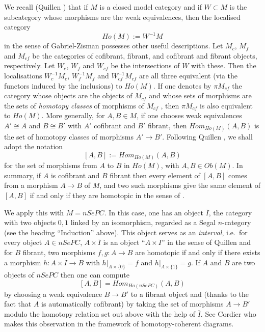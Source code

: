 
We recall (Quillen \cite{Quillen}) that if $M$ is a closed model
category and if $W\subset M$ is the subcategory whose morphisms are
the weak equivalences, then the localised category
$$
Ho(M):= W^{-1}M
$$
in the sense of Gabriel-Zisman \cite{GabrielZisman} possesses other useful
descriptions. Let $M_c$, $M_f$ and $M_{cf}$ be the categories of cofibrant,
fibrant, and cofibrant and fibrant objects, respectively. Let $W_c$, $W_f$ and
$W_{cf}$ be the intersections of $W$ with these. Then the localisations
$W_c^{-1} M_c$, $W_f^{-1}M_f$ and $W_{cf}^{-1}M_{cf}$ are all three
equivalent (via
the functors induced by the inclusions) to $Ho(M)$.
If one denotes by $\pi M_{cf}$ the category whose objects are the objects of
$M_{cf}$ and whose sets of morphisms are the sets of {\em homotopy
classes} of morphisms of $M_{cf}$ \cite{Quillen}, then $\pi M_{cf}$
is also
equivalent to $Ho(M)$. More generally, for $A,B\in M$, if one chooses
weak equivalences $A'\cong A$ and $B\cong B'$ with $A'$ cofibrant and
$B'$ fibrant, then $Hom _{Ho(M)}(A,B)$ is the set of homotopy classes
of morphisms $A'\rightarrow B'$. Following Quillen \cite{Quillen}, we shall
adopt the notation
$$
[A,B] := Hom _{Ho(M)}(A,B)
$$
for the set of morphisms from $A$ to $B$ in $Ho(M)$, with $A,B\in
Ob(M)$.
In summary, if $A$ is cofibrant and $B$ fibrant then every element of
$[A,B]$ comes from a morphism $A\rightarrow B$ of $M$, and two such morphisms
give the same element of $[A,B]$ if and only if they are homotopic
in the sense of \cite{Quillen}.

We apply this with $M= nSePC$. In this case, one has an object
$\overline{I}$, the category with two objects $0,1$ linked by an
isomorphism, regarded as a Segal $n$-category (see the heading
``Induction'' above). This object serves as an {\em interval}, i.e.\ for every
object
$A\in nSePC$, $A\times \overline{I}$ is an object ``$A\times I$'' in the sense of
Quillen \cite{Quillen} and for $B$ fibrant, two morphisms $f,g: A\rightarrow
B$ are homotopic if and only if there exists a morphism $h: A\times
\overline{I}\rightarrow B$ with $h|_{A\times \{ 0\} }=f$ and $h|_{A\times \{ 1\}
}=g$. If $A$ and $B$ are two objects of $nSePC$ then one can compute
$$
[A,B]= Hom _{Ho(nSePC)}(A,B)
$$
by choosing a weak
equivalence $B\rightarrow B'$ to a fibrant object and (thanks to the fact that
$A$ is
automatically cofibrant) by taking the set of morphisms $A\rightarrow
B'$ modulo the homotopy relation set out above with the help of
$\overline{I}$.
See Cordier \cite{Cordier} who makes this observation in the framework of
homotopy-coherent diagrams.
